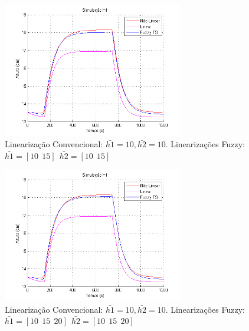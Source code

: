 \begin{figure}[H]
	\centering
	\includegraphics[width=0.7\textwidth]{img/FM_h1_10_15.png}
	\caption{\small Linearização Convencional: $ \bar{h1}=10, \bar{h2}=10$. Linearizações Fuzzy: $\bar{h1}=[10 \ \ 15] \ \ \bar{h2}=[10 \ \ 15]$ }
	\label{figH1FM_2}
\end{figure}

\begin{figure}[]
	\centering
	\includegraphics[width=0.7\textwidth]{img/FM_h1_10_15_20.png}
	\caption{\small Linearização Convencional: $ \bar{h1}=10, \bar{h2}=10$. Linearizações Fuzzy: $\bar{h1}=[10 \ \ 15 \ \ 20] \ \ \bar{h2}=[10 \ \ 15 \ \ 20]$ }
	\label{figH1FM_3}
\end{figure}

